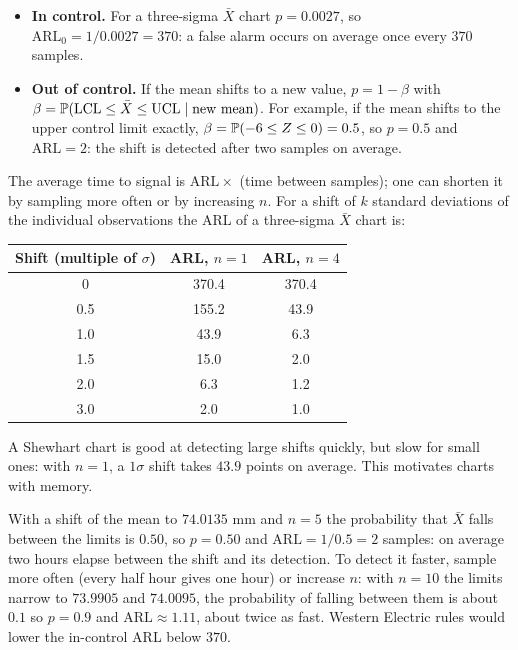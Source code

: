 \begin{itemize}
  \item \textbf{In control.} For a three-sigma $\bar{X}$ chart $p=0.0027$, so $\mathrm{ARL}_0=1/0.0027=370$: a false alarm occurs on average once every $370$ samples.
  \item \textbf{Out of control.} If the mean shifts to a new value, $p=1-\beta$ with $\beta=\mathbb{P}(\mathrm{LCL}\le\bar{X}\le\mathrm{UCL}\mid\text{new mean})$. For example, if the mean shifts to the upper control limit exactly, $\beta=\mathbb{P}(-6\le Z\le0)=0.5$, so $p=0.5$ and $\mathrm{ARL}=2$: the shift is detected after two samples on average.
\end{itemize}
The average time to signal is $\mathrm{ARL}\times$ (time between samples); one can shorten it by sampling more often or by increasing $n$. For a shift of $k$ standard deviations of the individual observations the ARL of a three-sigma $\bar{X}$ chart is:

\begin{center}
\begin{tabular}{c|cc}
\toprule
Shift (multiple of $\sigma$) & ARL, $n=1$ & ARL, $n=4$\\
\midrule
0 & 370.4 & 370.4\\
0.5 & 155.2 & 43.9\\
1.0 & 43.9 & 6.3\\
1.5 & 15.0 & 2.0\\
2.0 & 6.3 & 1.2\\
3.0 & 2.0 & 1.0\\
\bottomrule
\end{tabular}
\end{center}

A Shewhart chart is good at detecting large shifts quickly, but slow for small ones: with $n=1$, a $1\sigma$ shift takes $43.9$ points on average. This motivates charts with memory.

\begin{example}
With a shift of the mean to $74.0135$ mm and $n=5$ the probability that $\bar{X}$ falls between the limits is $0.50$, so $p=0.50$ and $\mathrm{ARL}=1/0.5=2$ samples: on average two hours elapse between the shift and its detection. To detect it faster, sample more often (every half hour gives one hour) or increase $n$: with $n=10$ the limits narrow to $73.9905$ and $74.0095$, the probability of falling between them is about $0.1$ so $p=0.9$ and $\mathrm{ARL}\approx1.11$, about twice as fast. Western Electric rules would lower the in-control ARL below $370$.
\end{example}

